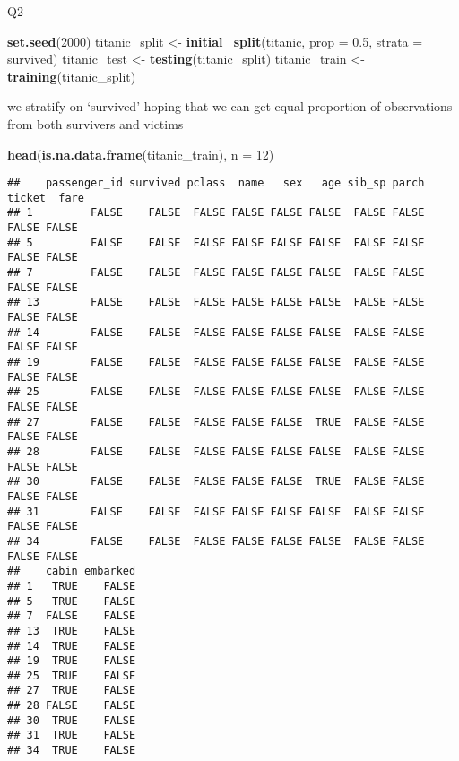 \documentclass[]{article}
\newenvironment{Shaded}{\begin{snugshade}}{\end{snugshade}}
\newcommand{\DataTypeTok}[1]{\textcolor[rgb]{0.13,0.29,0.53}{#1}}
\newcommand{\DecValTok}[1]{\textcolor[rgb]{0.00,0.00,0.81}{#1}}
\newcommand{\FloatTok}[1]{\textcolor[rgb]{0.00,0.00,0.81}{#1}}
\newcommand{\KeywordTok}[1]{\textcolor[rgb]{0.13,0.29,0.53}{\textbf{#1}}}
\newcommand{\NormalTok}[1]{#1}
\newcommand{\StringTok}[1]{\textcolor[rgb]{0.31,0.60,0.02}{#1}}
\begin{document}
Q2

\begin{Shaded}
\begin{Highlighting}[]
\KeywordTok{set.seed}\NormalTok{(}\DecValTok{2000}\NormalTok{)}
\NormalTok{titanic_split <-}\StringTok{ }\KeywordTok{initial_split}\NormalTok{(titanic, }\DataTypeTok{prop =} \FloatTok{0.5}\NormalTok{, }\DataTypeTok{strata =}\NormalTok{ survived)}
\NormalTok{titanic_test <-}\StringTok{ }\KeywordTok{testing}\NormalTok{(titanic_split)}
\NormalTok{titanic_train <-}\StringTok{ }\KeywordTok{training}\NormalTok{(titanic_split)}
\end{Highlighting}
\end{Shaded}

we stratify on `survived' hoping that we can get equal proportion of
observations from both survivers and victims

\begin{Shaded}
\begin{Highlighting}[]
\KeywordTok{head}\NormalTok{(}\KeywordTok{is.na.data.frame}\NormalTok{(titanic_train), }\DataTypeTok{n =} \DecValTok{12}\NormalTok{)}
\end{Highlighting}
\end{Shaded}

\begin{verbatim}
##    passenger_id survived pclass  name   sex   age sib_sp parch ticket  fare
## 1         FALSE    FALSE  FALSE FALSE FALSE FALSE  FALSE FALSE  FALSE FALSE
## 5         FALSE    FALSE  FALSE FALSE FALSE FALSE  FALSE FALSE  FALSE FALSE
## 7         FALSE    FALSE  FALSE FALSE FALSE FALSE  FALSE FALSE  FALSE FALSE
## 13        FALSE    FALSE  FALSE FALSE FALSE FALSE  FALSE FALSE  FALSE FALSE
## 14        FALSE    FALSE  FALSE FALSE FALSE FALSE  FALSE FALSE  FALSE FALSE
## 19        FALSE    FALSE  FALSE FALSE FALSE FALSE  FALSE FALSE  FALSE FALSE
## 25        FALSE    FALSE  FALSE FALSE FALSE FALSE  FALSE FALSE  FALSE FALSE
## 27        FALSE    FALSE  FALSE FALSE FALSE  TRUE  FALSE FALSE  FALSE FALSE
## 28        FALSE    FALSE  FALSE FALSE FALSE FALSE  FALSE FALSE  FALSE FALSE
## 30        FALSE    FALSE  FALSE FALSE FALSE  TRUE  FALSE FALSE  FALSE FALSE
## 31        FALSE    FALSE  FALSE FALSE FALSE FALSE  FALSE FALSE  FALSE FALSE
## 34        FALSE    FALSE  FALSE FALSE FALSE FALSE  FALSE FALSE  FALSE FALSE
##    cabin embarked
## 1   TRUE    FALSE
## 5   TRUE    FALSE
## 7  FALSE    FALSE
## 13  TRUE    FALSE
## 14  TRUE    FALSE
## 19  TRUE    FALSE
## 25  TRUE    FALSE
## 27  TRUE    FALSE
## 28 FALSE    FALSE
## 30  TRUE    FALSE
## 31  TRUE    FALSE
## 34  TRUE    FALSE
\end{verbatim}
\end{document}
